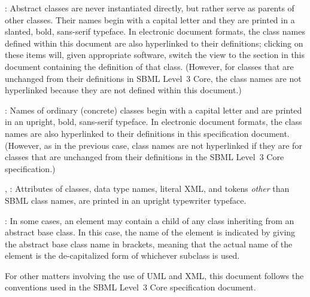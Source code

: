 \begin{description}
  
\item {}: Abstract classes are never instantiated directly, but rather serve as parents of other classes.  Their names begin with a capital letter and they are printed in a slanted, bold, sans-serif typeface.  In electronic document formats, the class names defined within this document are also hyperlinked to their definitions; clicking on these items will, given appropriate software, switch the view to the section in this document containing the definition of that class.  (However, for classes that are unchanged from their definitions in SBML Level~3 Core, the class names are not hyperlinked because they are not defined within this document.)
  
\item {}: Names of ordinary (concrete) classes begin with a capital letter and are printed in an upright, bold, sans-serif typeface.  In electronic document formats, the class names are also hyperlinked to their definitions in this specification document.  (However, as in the previous case, class names are not hyperlinked if they are for classes that are unchanged from their definitions in the SBML Level~3 Core specification.)

\item \emph{}, : Attributes of classes, data type names, literal XML, and tokens \emph{other} than SBML class names, are printed in an upright typewriter typeface.

\item \token{[elementName]}:  In some cases, an element may contain a child of any class inheriting from an abstract base class.  In this case, the name of the element is indicated by giving the abstract base class name in brackets, meaning that the actual name of the element is the de-capitalized form of whichever subclass is used.

\end{description}

For other matters involving the use of UML and XML, this document follows the conventions used in the SBML Level~3 Core specification document.

